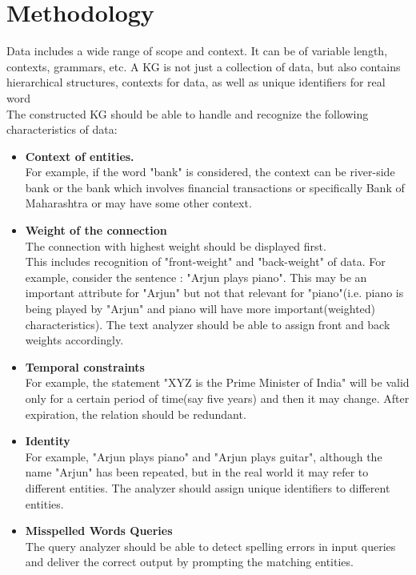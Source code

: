 \documentclass[conference]{IEEEtran}
\begin{document}
\section{Methodology}
Data includes a wide range of scope and context. It can be of variable length, contexts, grammars, etc.
A KG is not just a collection of data, but also contains hierarchical structures, contexts for data, as well as unique identifiers for real word \cite{b8}
\\
The constructed KG should be able to handle and recognize the following characteristics of data:
\begin{itemize}
    \item\textbf{Context of entities.}\cite{b8}\\ 
    For example, if the word "bank" is considered, the context can be river-side bank or the bank which involves financial transactions or specifically Bank of Maharashtra or may have some other context.
    

    
	\item\textbf{Weight of the connection}
 \\
 The connection with highest weight should be displayed first.
 \\
 This includes recognition of "front-weight" and "back-weight" of data. For example, consider the sentence : "Arjun plays piano". This may be an important attribute for "Arjun" but not that relevant for "piano"(i.e. piano is being played by "Arjun" and piano will have more important(weighted) characteristics). The text analyzer should be able to assign front and back weights accordingly.

 
	\item\textbf{Temporal constraints} \cite{b8, b17}
 \\
 For example, the statement "XYZ is the Prime Minister of India" will be valid only for a certain period of time(say five years) and then it may change. After expiration, the relation should be redundant.

 
	\item\textbf{Identity} \cite{b8,b16}
 \\
 For example, "Arjun plays piano" and "Arjun plays guitar", although the name "Arjun" has been repeated, but in the real world it may refer to different entities. 
 The analyzer should assign unique identifiers to different entities.
	
 \item\textbf{Misspelled Words Queries} 
 \\
 The query analyzer should be able to detect spelling errors in input queries and deliver the correct output by prompting the matching entities.
 
\end{itemize}
\end{document}
